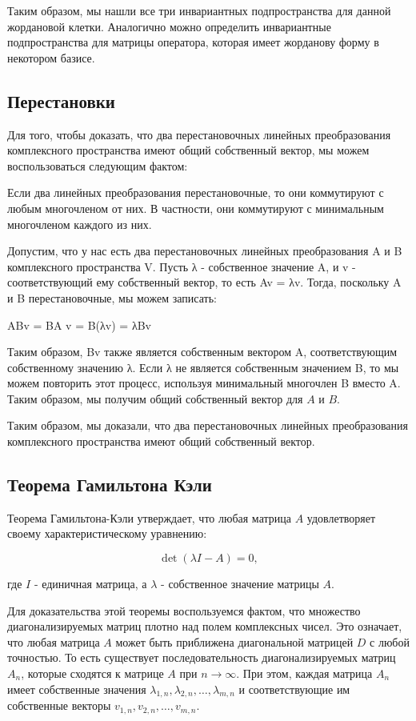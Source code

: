 Таким образом, мы нашли все три инвариантных подпространства для данной жордановой клетки.
Аналогично можно определить инвариантные подпространства для матрицы оператора, которая имеет жорданову форму в
некотором базисе.

 \subsection*{Перестановки}

Для того, чтобы доказать, что два перестановочных линейных преобразования комплексного пространства имеют общий
собственный вектор, мы можем воспользоваться следующим фактом:

Если два линейных преобразования перестановочные, то они коммутируют с любым многочленом от них.
В частности, они коммутируют с минимальным многочленом каждого из них.

Допустим, что у нас есть два перестановочных линейных преобразования A и B комплексного пространства V. Пусть λ -
собственное значение A, и v - соответствующий ему собственный вектор, то есть Av = λv.
Тогда, поскольку A и B перестановочные, мы можем записать:

ABv = BA v = B(λv) = λBv

Таким образом, Bv также является собственным вектором A, соответствующим собственному значению λ.
Если λ не является собственным значением B, то мы можем повторить этот процесс, используя минимальный многочлен B
вместо A. Таким образом, мы получим общий собственный вектор для $A$ и $B$.

Таким образом, мы доказали, что два перестановочных линейных преобразования комплексного пространства имеют общий
собственный вектор.

\subsection*{Теорема Гамильтона Кэли}

Теорема Гамильтона-Кэли утверждает, что любая матрица $A$ удовлетворяет своему характеристическому уравнению:

\[ \det(\lambda I - A) = 0, \]

где $I$ - единичная матрица, а $\lambda$ - собственное значение матрицы $A$.

Для доказательства этой теоремы воспользуемся фактом, что множество диагонализируемых матриц плотно над полем
комплексных чисел.
Это означает, что любая матрица $A$ может быть приближена диагональной матрицей $D$ с любой
точностью.
То есть существует последовательность диагонализируемых матриц $A_n$, которые сходятся к матрице $A$
при $n \rightarrow \infty$.
При этом, каждая матрица $A_n$ имеет собственные значения $\lambda_{1,n}, \lambda_{2,n}, \dots, \lambda_{m,n}$ и
соответствующие им собственные векторы $v_{1,n}, v_{2,n}, \dots, v_{m,n}$.

